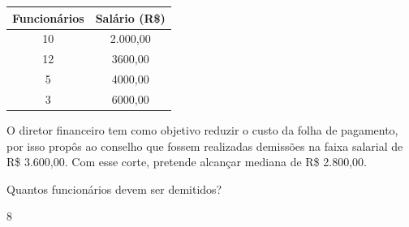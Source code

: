 \begin{escolha}
\begin{boxmedio}
\begin{boxmedio}
{\begin{boxpeq}
\begin{boxpeq}
{\begin{boxpeq}
\begin{boxmedio}
\begin{boxmedio}
\begin{boxpeq}
\begin{boxmedio}
\begin{boxpeq}
\begin{boxpeq}
\begin{boxpeq}
\begin{boxpeq}
\begin{boxmedio}
{\begin{boxmedio}
\begin{boxmedio}
\begin{boxpeq}
\begin{boxmedio}
\begin{boxpeq}
\begin{boxpeq}
\begin{boxpeq}
\begin{escolha}
{\begin{boxmedio}
\begin{boxpeq}
\begin{boxpeq}
\begin{boxpeq}
\begin{boxpeq}
\begin{boxpeq}
\begin{boxmedio}
\begin{boxpeq}
\begin{boxpeq}
\begin{boxpeq}
{\begin{boxpeq}
\begin{boxmedio}
\begin{boxpeq}
\begin{boxpeq}
\begin{boxpeq}
{\begin{boxpeq}
\begin{boxmedio}
{\begin{boxpeq}
\begin{boxpeq}
\begin{boxmedio}
\begin{boxmedio}
\begin{boxpeq}
\begin{boxpeq}
{\begin{boxpeq}
\begin{boxpeq}
\begin{boxpeq}
\begin{boxpeq}
\begin{boxpeq}
\begin{escolha}
\begin{escolha}
{\begin{boxmedio}
\begin{boxpeq}
\begin{q°}
\begin{boxmedio}
\begin{boxpeq}
\begin{boxpeq}
\begin{boxmedio}
\begin{boxmedio}
\begin{boxmedio}
\begin{boxmedio}
{\begin{escolha}
\begin{escolha}
\begin{table}[]
\begin{tabular}{|c|c|}
\hline
\rowcolor[HTML]{32CB00} 
\textbf{Funcionários} & \textbf{Salário (R\$)} \\ \hline
\rowcolor[HTML]{9AFF99} 
10 & 2.000,00 \\ \hline
12 & 3600,00 \\ \hline
\rowcolor[HTML]{9AFF99} 
5 & 4000,00 \\ \hline
3 & 6000,00 \\ \hline
\end{tabular}
\end{table}

O diretor financeiro tem como objetivo reduzir o custo da folha de
pagamento, por isso propôs ao conselho que fossem realizadas demissões
na faixa salarial de R\$ 3.600,00. Com esse corte, pretende alcançar
mediana de R\$ 2.800,00.

Quantos funcionários devem ser demitidos?

\begin{escolha}

  \item 8


\end{escolha}
\end{escolha}
\end{escolha}}
\end{boxmedio}
\end{boxmedio}
\end{boxmedio}
\end{boxmedio}
\end{boxpeq}
\end{boxpeq}
\end{boxmedio}
\end{q°}
\end{boxpeq}
\end{boxmedio}}
\end{escolha}
\end{escolha}
\end{boxpeq}
\end{boxpeq}
\end{boxpeq}
\end{boxpeq}
\end{boxpeq}}
\end{boxpeq}
\end{boxpeq}
\end{boxmedio}
\end{boxmedio}
\end{boxpeq}
\end{boxpeq}}
\end{boxmedio}
\end{boxpeq}}
\end{boxpeq}
\end{boxpeq}
\end{boxpeq}
\end{boxmedio}
\end{boxpeq}}
\end{boxpeq}
\end{boxpeq}
\end{boxpeq}
\end{boxmedio}
\end{boxpeq}
\end{boxpeq}
\end{boxpeq}
\end{boxpeq}
\end{boxpeq}
\end{boxmedio}}
\end{escolha}
\end{boxpeq}
\end{boxpeq}
\end{boxpeq}
\end{boxmedio}
\end{boxpeq}
\end{boxmedio}
\end{boxmedio}}
\end{boxmedio}
\end{boxpeq}
\end{boxpeq}
\end{boxpeq}
\end{boxpeq}
\end{boxmedio}
\end{boxpeq}
\end{boxmedio}
\end{boxmedio}
\end{boxpeq}}
\end{boxpeq}
\end{boxpeq}}
\end{boxmedio}
\end{boxmedio}
\end{escolha}

